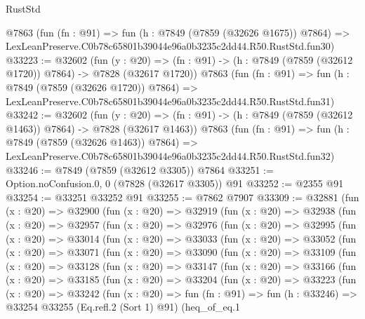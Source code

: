 \begin{lexlean}{RustStd}
\begin{coremodule}
    @7863
    (fun (fn : @91) =>
    fun (h : @7849 (@7859 (@32626 @1675)) @7864) =>
    LexLeanPreserve.C0b78c65801b39044e96a0b3235c2dd44.R50.RustStd.fun30)
@33223 := @32602
    (fun (y : @20) =>
    (fn : @91) -> (h : @7849 (@7859 (@32612 @1720)) @7864) -> @7828 (@32617 @1720))
    @7863
    (fun (fn : @91) =>
    fun (h : @7849 (@7859 (@32626 @1720)) @7864) =>
    LexLeanPreserve.C0b78c65801b39044e96a0b3235c2dd44.R50.RustStd.fun31)
@33242 := @32602
    (fun (y : @20) =>
    (fn : @91) -> (h : @7849 (@7859 (@32612 @1463)) @7864) -> @7828 (@32617 @1463))
    @7863
    (fun (fn : @91) =>
    fun (h : @7849 (@7859 (@32626 @1463)) @7864) =>
    LexLeanPreserve.C0b78c65801b39044e96a0b3235c2dd44.R50.RustStd.fun32)
@33246 := @7849 (@7859 (@32612 @3305)) @7864
@33251 := Option.noConfusion.{0, 0} (@7828 (@32617 @3305)) @91
@33252 := @2355 @91
@33254 := @33251 @33252 @91
@33255 := @7862 @7907
@33309 := @32881
    (fun (x : @20) =>
    @32900
      (fun (x : @20) =>
      @32919
        (fun (x : @20) =>
        @32938
          (fun (x : @20) =>
          @32957
            (fun (x : @20) =>
            @32976
              (fun (x : @20) =>
              @32995
                (fun (x : @20) =>
                @33014
                  (fun (x : @20) =>
                  @33033
                    (fun (x : @20) =>
                    @33052
                      (fun (x : @20) =>
                      @33071
                        (fun (x : @20) =>
                        @33090
                          (fun (x : @20) =>
                          @33109
                            (fun (x : @20) =>
                            @33128
                              (fun (x : @20) =>
                              @33147
                                (fun (x : @20) =>
                                @33166
                                  (fun (x : @20) =>
                                  @33185
                                    (fun (x : @20) =>
                                    @33204
                                      (fun (x : @20) =>
                                      @33223
                                        (fun (x : @20) =>
                                        @33242
                                          (fun (x : @20) =>
                                          fun (fn : @91) =>
                                          fun (h : @33246) =>
                                          @33254
                                            @33255
                                            (Eq.refl.{2} (Sort 1) @91)
                                            (heq_of_eq.{1}

\end{coremodule}
\end{lexlean}
